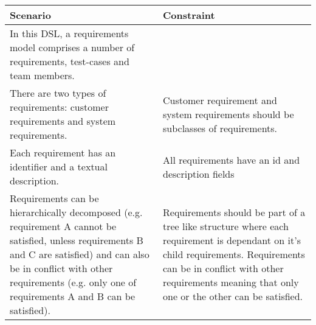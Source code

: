 \documentclass[11pt,a4paper]{scrartcl}
\begin{document}
\begin{center}
	\begin{longtable}{| p{0.5\linewidth} | p{0.5\linewidth} |}
		\hline
		\textbf{Scenario} & \textbf{Constraint} \\ \hline
		
		In this DSL, a requirements model comprises a number of requirements, test-cases and team members. 
		& \\ \hline
		
		There are two types of requirements: customer requirements and system requirements. 
		& Customer requirement and system requirements should be subclasses of requirements. \\ \hline
		
		Each requirement has an identifier and a textual description.
		& All requirements have an id and description fields \\ \hline
		
		Requirements can be hierarchically decomposed (e.g. requirement A cannot be satisfied, unless requirements B and C are satisfied) and can also be in conflict with other requirements (e.g. only one of requirements A and B can be satisfied). 
		& Requirements should be part of a tree like structure where each requirement is dependant on it's child requirements. Requirements can be in conflict with other requirements meaning that only one or the other can be satisfied. \\ \hline
		

\end{longtable}
\end{center}
\end{document}
